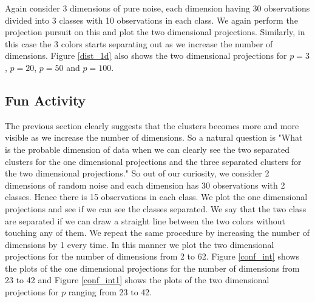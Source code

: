 \documentclass[12]{report}
\begin{document}

Again consider 3 dimensions of pure noise, each dimension having 30 observations divided into 3 classes with 10 observations in each class. We again perform the projection pursuit on this and plot the two dimensional projections. Similarly, in this case the 3 colors starts separating out as we increase the number of dimensions.  Figure \ref{dist_1d} also shows the two dimensional projections for $p=3$, $p=20$, $p=50$ and $p=100$.







\subsection{Fun Activity}

The previous section clearly suggests that the clusters becomes more and more visible as we increase the number of dimensions. So a natural question is "What is the probable dimension of data when we can clearly see the two separated clusters for the one dimensional projections and the three separated clusters for the two dimensional projections." So out of our curiosity,  we consider 2 dimensions of random noise and each dimension has 30 observations with 2 classes. Hence there is 15 observations in each class. We plot the one dimensional projections and see if we can see the classes separated. We say that the two class are separated if we can draw a straight line between the two colors without touching any of them. We repeat the same procedure by increasing the number of dimensions by 1 every time. In this manner we plot the two dimensional projections for the number of dimensions from 2 to 62. Figure \ref{conf_int} shows the plots of the one dimensional projections for the number of dimensions from 23 to 42 and Figure \ref{conf_int1} shows the plots of the two dimensional projections for $p$ ranging from 23 to 42.
\end{document}
